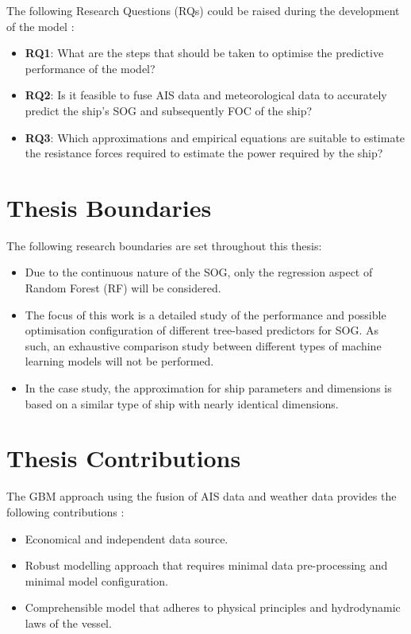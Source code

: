 The following Research Questions (RQs) could be raised during the development of the model :

\begin{itemize}
    \item \textbf{RQ1}: What are the steps that should be taken to optimise the predictive performance of the model?
    \item \textbf{RQ2}: Is it feasible to fuse AIS data and meteorological data to accurately predict the ship's SOG and subsequently FOC of the ship?
    \item \textbf{RQ3}: Which approximations and empirical equations are suitable to estimate the resistance forces required to estimate the power required by the ship? 
\end{itemize} 

\section{Thesis Boundaries}\label{sec:boundaries}

The following research boundaries are set throughout this thesis:

\begin{itemize}
    \item Due to the continuous nature of the SOG, only the regression aspect of Random Forest (RF) will be considered.
    \item The focus of this work is a detailed study of the performance and possible optimisation configuration of different tree-based predictors for SOG. As such, an exhaustive comparison study between different types of machine learning models will not be performed.
    \item In the case study, the approximation for ship parameters and dimensions is based on a similar type of ship with nearly identical dimensions. 
\end{itemize}

\section{Thesis Contributions}\label{sec:contributions}

The GBM approach using the fusion of AIS data and weather data provides the following contributions : 

\begin{itemize}
    \item Economical and independent data source.
    \item Robust modelling approach that requires minimal data pre-processing and minimal model configuration.
    \item Comprehensible model that adheres to physical principles and hydrodynamic laws of the vessel.  
\end{itemize} 

